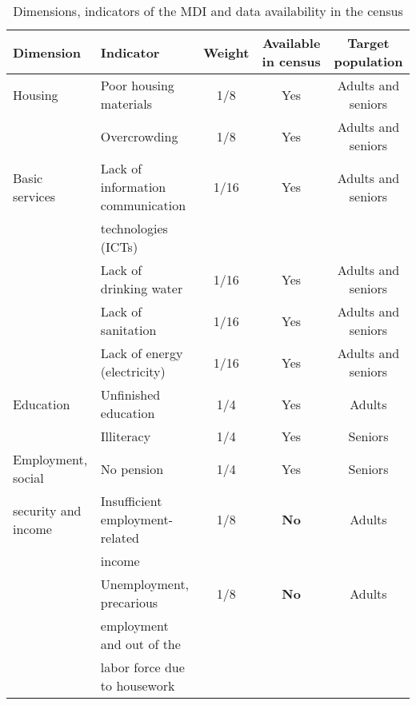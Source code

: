 \documentclass[a4paper, 11pt]{article}
\begin{document}
\begin{table}[ht]
\begin{center}
\small{
	\caption{Dimensions, indicators of the MDI and data availability in the census}
	\centering
\begin{tabular}{llccc}
				\hline
				Dimension &Indicator& Weight &Available in census &Target population  \\
				\hline
				Housing &Poor housing materials & 1/8 & Yes & Adults and seniors\\
				& Overcrowding & 1/8 &Yes & Adults and seniors \\
				\hline
				Basic services &  Lack of information communication & 1/16 &Yes & Adults and seniors \\
				& technologies (ICTs) & &\\
				& Lack of drinking water & 1/16&Yes & Adults and seniors \\
				& Lack of sanitation &1/16 & Yes & Adults and seniors \\
				& Lack of energy (electricity) & 1/16&Yes & Adults and seniors \\
				\hline
				Education & Unfinished education & 1/4 &Yes &Adults \\
				& Illiteracy& 1/4 &Yes & Seniors \\
				\hline
				Employment, social  & No pension & 1/4 &Yes & Seniors \\
				security and income & Insufficient employment-related  &1/8 & \textbf{No} &Adults \\
				&income&&&\\
				& Unemployment, precarious  &1/8 & \textbf{No} & Adults\\
				& employment and out of the &&&\\
				&labor force due to housework&&&\\
				
				
				\hline
			\end{tabular}
	}
	\end{center}
\end{table}

\end{document}

